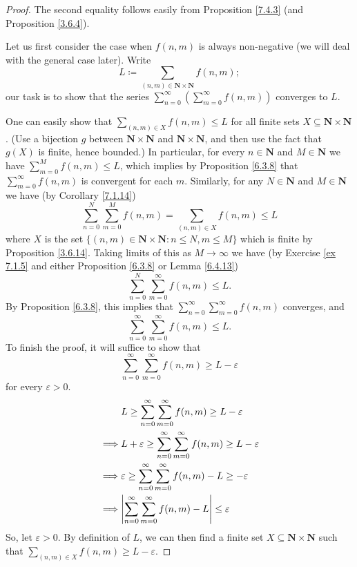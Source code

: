\begin{proof}
The second equality follows easily from Proposition \ref{7.4.3} (and Proposition \ref{3.6.4}).

Let us first consider the case when \(f(n, m)\) is always non-negative (we will deal with the general case later).
Write
\[
    L \coloneqq \sum_{(n, m) \in \mathbf{N} \times \mathbf{N}} f(n, m);
\]
our task is to show that the series \(\sum_{n = 0}^\infty (\sum_{m = 0}^\infty f(n, m))\) converges to \(L\).

One can easily show that \(\sum_{(n, m) \in X} f(n, m) \leq L\) for all finite sets \(X \subseteq \mathbf{N} \times \mathbf{N}\).
(Use a bijection \(g\) between \(\mathbf{N} \times \mathbf{N}\) and \(\mathbf{N} \times \mathbf{N}\), and then use the fact that \(g(X)\) is finite, hence bounded.)
In particular, for every \(n \in \mathbf{N}\) and \(M \in \mathbf{N}\) we have \(\sum_{m = 0}^M f(n, m) \leq L\), which implies by Proposition \ref{6.3.8} that \(\sum_{m = 0}^\infty f(n, m)\) is convergent for each \(m\).
Similarly, for any \(N \in \mathbf{N}\) and \(M \in \mathbf{N}\) we have (by Corollary \ref{7.1.14})
\[
    \sum_{n = 0}^N \sum_{m = 0}^M f(n, m) = \sum_{(n, m) \in X} f(n, m) \leq L
\]
where \(X\) is the set \(\{(n,m) \in \mathbf{N} \times \mathbf{N} : n \leq N, m \leq M\}\) which is finite by Proposition \ref{3.6.14}.
Taking limits of this as \(M \to \infty\) we have (by Exercise \ref{ex 7.1.5} and either Proposition \ref{6.3.8} or Lemma \ref{6.4.13})
\[
    \sum_{n = 0}^N \sum_{m = 0}^\infty f(n, m) \leq L.
\]
By Proposition \ref{6.3.8}, this implies that \(\sum_{n = 0}^\infty \sum_{m = 0}^\infty f(n, m)\) converges, and
\[
    \sum_{n = 0}^\infty \sum_{m = 0}^\infty f(n, m) \leq L.
\]
To finish the proof, it will suffice to show that
\[
    \sum_{n = 0}^\infty \sum_{m = 0}^\infty f(n, m) \geq L - \varepsilon
\]
for every \(\varepsilon > 0\).
\begin{align*}
& L \geq \sum_{n = 0}^\infty \sum_{m = 0}^\infty f(n, m) \geq L - \varepsilon \\
\implies & L + \varepsilon \geq \sum_{n = 0}^\infty \sum_{m = 0}^\infty f(n, m) \geq L - \varepsilon \\
\implies & \varepsilon \geq \sum_{n = 0}^\infty \sum_{m = 0}^\infty f(n, m) - L \geq -\varepsilon \\
\implies & \abs*{\sum_{n = 0}^\infty \sum_{m = 0}^\infty f(n, m) - L} \leq \varepsilon \\
\end{align*}
So, let \(\varepsilon > 0\).
By definition of \(L\), we can then find a finite set \(X \subseteq \mathbf{N} \times \mathbf{N}\) such that \(\sum_{(n, m) \in X} f(n, m) \geq L - \varepsilon\).

\end{proof}
